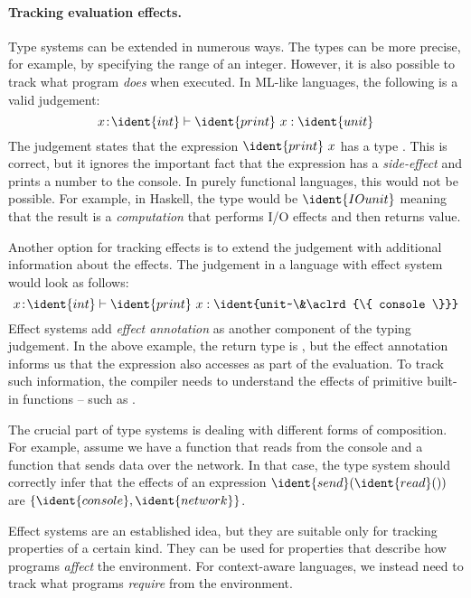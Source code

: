 \paragraph{Tracking evaluation effects.}
Type systems can be extended in numerous ways. The types can be more precise, for example, by specifying
the range of an integer. However, it is also possible to track what program \emph{does} when executed.
In ML-like languages, the following is a valid judgement:
%
\begin{equation*}
x\!:\!\ident{int} \vdash \ident{print}~x : \ident{unit}
\end{equation*}
%
The judgement states that the expression $\ident{print}~x$ has a type . This is correct, 
but it ignores the important fact that the expression has a \emph{side-effect} and prints a number
to the console. In purely functional languages, this would not be possible. For example, in Haskell,
the type would be $\ident{IO unit}$ meaning that the result is a \emph{computation} that performs I/O
effects and then returns  value. 

Another option for tracking effects is to extend the judgement with additional information 
about the effects. The judgement in a language with effect system would look as follows:
%
\begin{equation*}
x\!:\!\ident{int} \vdash \ident{print}~x : \ident{unit~\&\aclrd{\{ console \}}}
\end{equation*}
%
Effect systems add \emph{effect annotation} as another component of the typing judgement. In the above
example, the return type is , but the effect annotation informs us that the expression
also accesses  as part of the evaluation. To track such information, the compiler needs
to understand the effects of primitive built-in functions -- such as .

The crucial part of type systems is dealing with different forms of composition. For example, assume
we have a function  that reads from the console and a function  that sends
data over the network. In that case, the type system should correctly infer that the effects of an 
expression $\ident{send}(\ident{read}())$ are $\{ \ident{console}, \ident{network} \}$.

Effect systems are an established idea, but they are suitable only for tracking properties of a
certain kind. They can be used for properties that describe how programs \emph{affect} the environment.
For context-aware languages, we instead need to track what programs \emph{require} from the environment.

